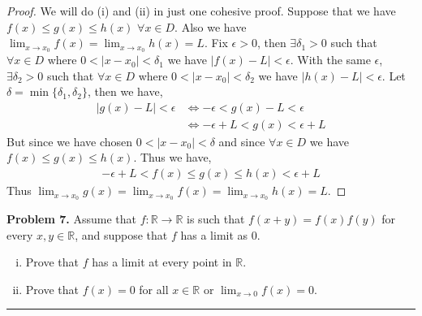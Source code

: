 \documentclass[leqno]{article}
\theoremstyle{nonumberplain}
\newtheorem{proof}{Proof}
\begin{document}
\begin{proof}
We will do (i) and (ii) in just one cohesive proof.  Suppose that we have $f(x)\leq g(x) \leq h(x)$ $\forall x \in D$.  Also we have $\lim_{x \to x_0} f(x) = \lim_{x \to x_0} h(x) = L$.  Fix $\epsilon > 0$, then $\exists \delta_1 >0$ such that $\forall x \in D$ where $0<|x-x_0|<\delta_1$ we have $|f(x)-L|<\epsilon$.  With the same $\epsilon$, $\exists \delta_2 >0$ such that $\forall x \in D$ where $0< |x-x_0|<\delta_2$ we have $|h(x)-L|<\epsilon$.  Let $\delta = \min\{\delta_1,\delta_2\}$, then we have,
\begin{align*}
|g(x)-L|<\epsilon &\iff -\epsilon < g(x) - L < \epsilon\\
&\iff -\epsilon + L < g(x) < \epsilon + L 
\end{align*}
But since we have chosen $0<|x-x_0|<\delta$ and since $\forall x \in D$ we have $f(x)\leq g(x) \leq h(x)$. Thus we have,
\begin{align*}
-\epsilon + L < f(x) \leq g(x) \leq h(x) < \epsilon + L
\end{align*}
Thus $\lim_{x\to x_0}g(x)=\lim_{x \to x_0} f(x) = \lim_{x \to x_0} h(x) = L$.  
\end{proof}

\pagebreak




\noindent\textbf{Problem 7.} Assume that $f \colon \mathbb{R} \to \mathbb{R}$ is such that $f(x+y) = f(x)f(y)$ for every $x,y \in \mathbb{R}$, and suppose that $f$ has a limit as $0$.  
\begin{enumerate}[(i)]
\item
Prove that $f$ has a limit at every point in $\mathbb{R}$.
\item
Prove that $f(x) = 0$ for all $x \in \mathbb{R}$ or $\lim_{x \to 0} f(x) =0$.
\end{enumerate}

\noindent\rule[0.5ex]{\linewidth}{1pt}
\end{document}
